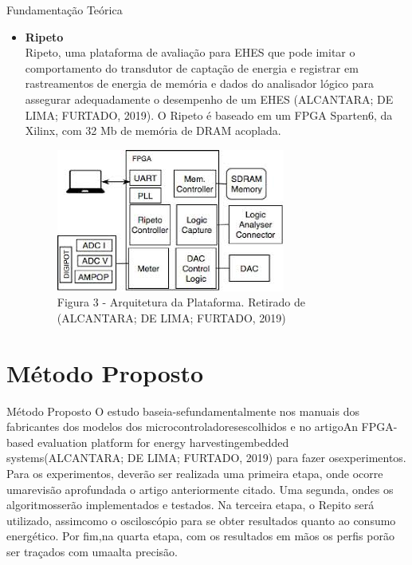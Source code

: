 \documentclass{IFES-beamer}
\begin{document}
\begin{frame}{Fundamentação Teórica}
\begin{itemize}
    \item \textbf {Ripeto}\\  Ripeto, uma plataforma de avaliação para EHES que pode imitar o comportamento do transdutor de captação de energia e registrar em rastreamentos de energia de memória e dados do analisador lógico para assegurar adequadamente o desempenho de um EHES (ALCANTARA; DE LIMA; FURTADO, 2019). O Ripeto é baseado em um FPGA Sparten6, da Xilinx, com 32 Mb de memória de DRAM acoplada.
    \begin{figure}
        \centering
        \includegraphics[scale=0.5]{images/ripeto.png}
        \caption{Figura 3 - Arquitetura da Plataforma. Retirado de (ALCANTARA; DE LIMA; FURTADO, 2019)}
        
    \end{figure}
\end{itemize}
\end{frame}


\section{Método Proposto}

\begin{frame}{Método Proposto}
  O  estudo  baseia-sefundamentalmente nos manuais dos fabricantes dos modelos dos microcontroladoresescolhidos  e  no  artigoAn FPGA-based evaluation platform for energy harvestingembedded systems(ALCANTARA;   DE   LIMA;   FURTADO,   2019)   para   fazer   osexperimentos.\\
  Para os experimentos, deverão ser realizada uma primeira etapa, onde ocorre umarevisão aprofundada o artigo anteriormente citado. Uma segunda, ondes os algoritmosserão implementados e testados.   Na terceira etapa,  o Repito será utilizado,  assimcomo o osciloscópio para se obter resultados quanto ao consumo energético. Por fim,na quarta etapa, com os resultados em mãos os perfis porão ser traçados com umaalta precisão.
 \end{frame}
\end{document}

